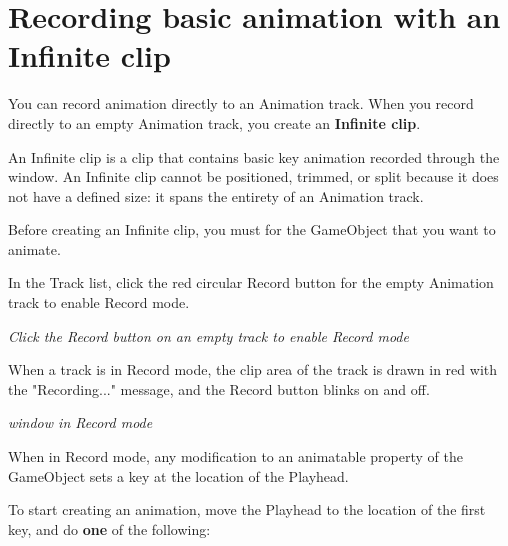 \chapter{Recording basic animation with an Infinite clip}
\hypertarget{md__library_2_package_cache_2com_8unity_8timeline_0d1_87_86_2_documentation_0i_2wf__rec__anim}{}\label{md__library_2_package_cache_2com_8unity_8timeline_0d1_87_86_2_documentation_0i_2wf__rec__anim}
\label{md__library_2_package_cache_2com_8unity_8timeline_0d1_87_86_2_documentation_0i_2wf__rec__anim_autotoc_md1274}%
%
 You can record animation directly to an Animation track. When you record directly to an empty Animation track, you create an {\bfseries{Infinite clip}}.

An Infinite clip is a clip that contains basic key animation recorded through the  window. An Infinite clip cannot be positioned, trimmed, or split because it does not have a defined size\+: it spans the entirety of an Animation track.

Before creating an Infinite clip, you must  for the Game\+Object that you want to animate.

In the Track list, click the red circular Record button for the empty Animation track to enable Record mode.



{\itshape Click the Record button on an empty track to enable Record mode}

When a track is in Record mode, the clip area of the track is drawn in red with the "{}\+Recording..."{} message, and the Record button blinks on and off.



{\itshape {} window in Record mode}

When in Record mode, any modification to an animatable property of the Game\+Object sets a key at the location of the  Playhead.

To start creating an animation, move the  Playhead to the location of the first key, and do {\bfseries{one}} of the following\+:


